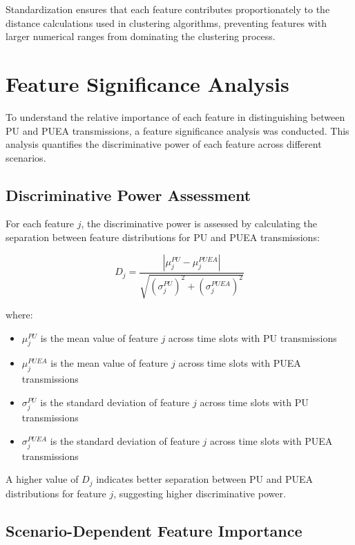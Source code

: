 Standardization ensures that each feature contributes proportionately to the distance calculations used in clustering algorithms, preventing features with larger numerical ranges from dominating the clustering process.

\section{Feature Significance Analysis}

To understand the relative importance of each feature in distinguishing between PU and PUEA transmissions, a feature significance analysis was conducted. This analysis quantifies the discriminative power of each feature across different scenarios.

\subsection{Discriminative Power Assessment}

For each feature $j$, the discriminative power is assessed by calculating the separation between feature distributions for PU and PUEA transmissions:

\begin{equation}
    D_j = \frac{|\mu_j^{PU} - \mu_j^{PUEA}|}{\sqrt{(\sigma_j^{PU})^2 + (\sigma_j^{PUEA})^2}}
\end{equation}

where:
\begin{itemize}
    \item $\mu_j^{PU}$ is the mean value of feature $j$ across time slots with PU transmissions
    \item $\mu_j^{PUEA}$ is the mean value of feature $j$ across time slots with PUEA transmissions
    \item $\sigma_j^{PU}$ is the standard deviation of feature $j$ across time slots with PU transmissions
    \item $\sigma_j^{PUEA}$ is the standard deviation of feature $j$ across time slots with PUEA transmissions
\end{itemize}

A higher value of $D_j$ indicates better separation between PU and PUEA distributions for feature $j$, suggesting higher discriminative power.

\subsection{Scenario-Dependent Feature Importance}

